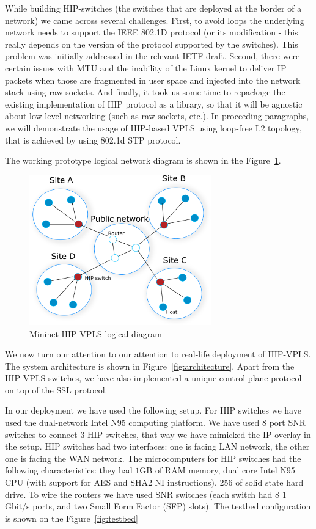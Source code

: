 While building HIP-switches (the switches that are deployed at the border of a network) 
we came across several challenges. First, to avoid loops the underlying network needs to support 
the IEEE 802.1D protocol (or its modification - this really depends on the version of the protocol 
supported by the switches). This problem was initially addressed in the relevant IETF draft. 
Second, there were certain issues with MTU and the inability of the Linux kernel to deliver IP 
packets when those are fragmented in user space and injected into the network stack using raw 
sockets. And finally, it took us some time to repackage the existing implementation of HIP protocol 
as a library, so that it will be agnostic about low-level networking (such as raw sockets, etc.). 
In proceeding paragraphs, we will demonstrate the usage of HIP-based VPLS using loop-free L2 topology,
that is achieved by using 802.1d STP protocol.

The working prototype logical network diagram is shown in the Figure~\ref{fig:mininet}.

\begin{figure}[h!]
    \centering
    \includegraphics[width=0.7\textwidth]{graphics/mininet.png}
    \caption{Mininet HIP-VPLS logical diagram}
    \label{fig:mininet}
\end{figure}

We now turn our attention to our attention to real-life deployment 
of HIP-VPLS. The system architecture is shown in Figure~\ref{fig:architecture}. 
Apart from the HIP-VPLS switches, we have also implemented a unique 
control-plane protocol on top of the SSL protocol. 

In our deployment we have used the following setup. For HIP switches we 
have used the dual-network Intel N95 computing platform. We have used $8$ 
port SNR switches to connect 3 HIP switches, that way we have mimicked the 
IP overlay in the setup. HIP switches had two interfaces: one is facing 
LAN network, the other one is facing the WAN network. The microcomputers for
HIP switches had the following characteristics: they had $1$GB of RAM memory, 
dual core Intel N95 CPU (with support for AES and SHA2 NI instructions), 256 of 
solid state hard drive. To wire the routers we have used SNR switches 
(each switch had $8$ $1$ Gbit/s ports, and two Small Form Factor (SFP) slots). 
The testbed configuration is shown on the Figure~\ref{fig:testbed}


